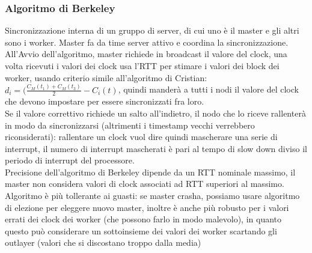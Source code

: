 \documentclass[16px]{article}
\begin{document}
\subsubsection{Algoritmo di Berkeley}
Sincronizzazione interna di un gruppo di server, di cui uno è il master e gli altri sono i worker. Master fa da time server attivo e coordina la sincronizzazione. All'Avvio dell'algoritmo, master richiede in broadcast il valore del clock, una volta ricevuti i valori dei clock usa l'RTT per stimare i valori dei block dei worker, usando criterio simile all'algoritmo di Cristian: $d_i = (\frac{C_M(t_1) + C_M(t_3)}{2} - C_i(t)$, quindi manderà a tutti i nodi il valore del clock che devono impostare per essere sincronizzati fra loro.\\ Se il valore correttivo richiede un salto all'indietro, il nodo che lo riceve rallenterà in modo da sincronizzarsi (altrimenti i timestamp vecchi verrebbero riconsiderati): rallentare un clock vuol dire quindi mascherare una serie di interrupt, il numero di interrupt mascherati è pari al tempo di slow down diviso il periodo di interrupt del processore.\\ Precisione dell'algoritmo di Berkeley dipende da un RTT nominale massimo, il master non considera valori di clock associati ad RTT superiori al massimo.\\ Algoritmo è più tollerante ai guasti: se master crasha, possiamo usare algoritmo di elezione per eleggere nuovo master, inoltre è anche più robusto per i valori errati dei clock dei worker (che possono farlo in modo malevolo), in quanto questo può considerare un sottoinsieme dei valori dei worker scartando gli outlayer (valori che si discostano troppo dalla media)
\end{document}
